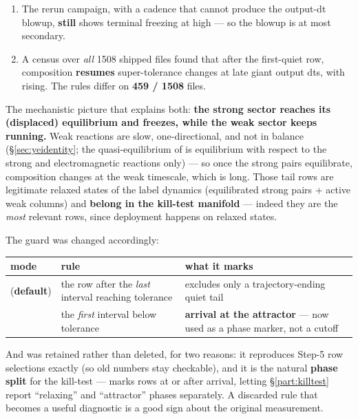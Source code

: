 \begin{enumerate}
\item The rerun campaign, with a cadence that cannot produce the output-dt
  blowup, \textbf{still} shows terminal freezing at high \Tn{} --- so the
  blowup is at most secondary.
\item A census over \emph{all} 1508 shipped files found that after the
  first-quiet row, composition \textbf{resumes} super-tolerance changes at late
  giant output dts, with  rising. The rules differ on
  \textbf{459 / 1508} files. 
\end{enumerate}

The mechanistic picture that explains both: \textbf{the strong sector reaches
its (displaced) equilibrium and freezes, while the weak sector keeps running.}
Weak reactions are slow, one-directional, and not in balance
(\S\ref{sec:yeidentity}; the quasi-equilibrium of \citealt{hix1996} is
equilibrium with respect to the strong and electromagnetic reactions only) ---
so once the strong pairs equilibrate, composition changes at the weak
timescale, which is long. Those tail rows are legitimate relaxed states of the
label dynamics (equilibrated strong pairs + active weak columns) and
\textbf{belong in the kill-test manifold} --- indeed they are the \emph{most}
relevant rows, since deployment happens on relaxed states.

The guard was changed accordingly:

\begin{tabularx}{\textwidth}{@{}L{3.2cm} L{5.4cm} Y@{}}
\toprule
\textbf{mode} & \textbf{rule} & \textbf{what it marks} \\
\midrule
{} (\textbf{default}) & the row after the \emph{last} interval
  reaching tolerance & excludes only a trajectory-ending quiet tail \\
 & the \emph{first} interval below tolerance &
  \textbf{arrival at the attractor} --- now used as a phase marker, not a
  cutoff \\
\bottomrule
\end{tabularx}

And  was retained rather than deleted, for two reasons: it
reproduces Step-5 row selections exactly (so old numbers stay checkable), and
it is the natural \textbf{phase split} for the kill-test ---
 marks rows at or after arrival, letting
\S\ref{part:killtest} report ``relaxing'' and ``attractor'' phases separately.
A discarded rule that becomes a useful diagnostic is a good sign about the
original measurement.

